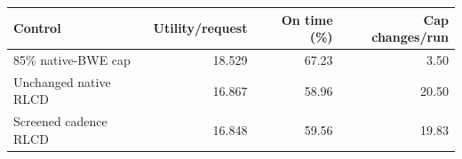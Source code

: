 \begin{tabular}{lrrr}
\toprule
Control & Utility/request & On time (\%) & Cap changes/run\\
\midrule
85\% native-BWE cap & 18.529 & 67.23 & 3.50 \\
Unchanged native RLCD & 16.867 & 58.96 & 20.50 \\
Screened cadence RLCD & 16.848 & 59.56 & 19.83 \\
\bottomrule
\end{tabular}
